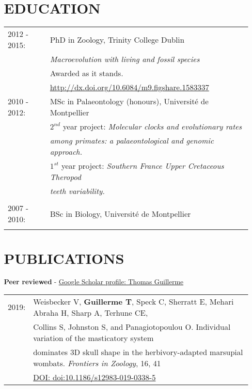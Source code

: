 \documentclass[10pt,a4paper]{article}
\begin{document}
{\begin{tabular}{ll}
\end{tabular}

\section{EDUCATION}
\raggedright
\begin{tabular}{ll} 
2012 - 2015: & PhD in Zoology, Trinity College Dublin\\
& \textit{Macroevolution with living and fossil species} \\
& Awarded as it stands. \\
& \href{http://figshare.com/articles/Macroevolution_with_living_and_fossil_species/1583337}{http://dx.doi.org/10.6084/m9.figshare.1583337} \\
2010 - 2012: & MSc in Palaeontology (honours), Universit\'{e} de Montpellier\\
& $2^{nd}$ year project: \textit{Molecular clocks and evolutionary rates}\\
& \textit{among primates: a palaeontological and genomic approach.} \\
& $1^{st}$ year project: \textit{Southern France Upper Cretaceous Theropod}\\
& \textit{teeth variability.} \\
& \\
2007 - 2010: & BSc in Biology, Universit\'{e} de Montpellier\\
& \\
\end{tabular}

\section{PUBLICATIONS}
\raggedright\textbf{Peer reviewed} - \href{https://scholar.google.co.uk/citations?user=LA9l9EkAAAAJ&hl=en}{Google Scholar profile: Thomas Guillerme}\\[1.5ex]

\begin{tabular}{ll}
2019: & Weisbecker V, \textbf{Guillerme T}, Speck C, Sherratt E, Mehari Abraha H, Sharp A, Terhune CE, \\
      & Collins S, Johnston S, and Panagiotopoulou O. Individual variation of the masticatory system \\
      & dominates 3D skull shape in the herbivory-adapted marsupial wombats. \textit{Frontiers in Zoology}, 16, 41\\
      & \href{https://frontiersinzoology.biomedcentral.com/articles/10.1186/s12983-019-0338-5}{DOI: doi:10.1186/s12983-019-0338-5}\\
\end{tabular}
\bigskip

}
\end{document}
